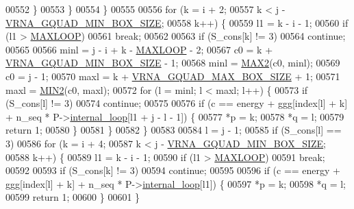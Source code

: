 \begin{DoxyCode}
00552       \}
00553     \}
00554   \}
00555 
00556   \textcolor{keywordflow}{for} (k = i + 2;
00557        k < j - \mbox{\hyperlink{group__energy__parameters_gad7bdd880afca461f97763d79ee57a347}{VRNA\_GQUAD\_MIN\_BOX\_SIZE}};
00558        k++) \{
00559     l1 = k - i - 1;
00560     \textcolor{keywordflow}{if} (l1 > \mbox{\hyperlink{energy__const_8h_ad1bd6eabac419670ddd3c9ed82145988}{MAXLOOP}})
00561       \textcolor{keywordflow}{break};
00562 
00563     \textcolor{keywordflow}{if} (S\_cons[k] != 3)
00564       \textcolor{keywordflow}{continue};
00565 
00566     minl  = j - i + k - \mbox{\hyperlink{energy__const_8h_ad1bd6eabac419670ddd3c9ed82145988}{MAXLOOP}} - 2;
00567     c0    = k + \mbox{\hyperlink{group__energy__parameters_gad7bdd880afca461f97763d79ee57a347}{VRNA\_GQUAD\_MIN\_BOX\_SIZE}} - 1;
00568     minl  = \mbox{\hyperlink{group__utils_ga33297b3679c713b0c4d897cd0fe3b122}{MAX2}}(c0, minl);
00569     c0    = j - 1;
00570     maxl  = k + \mbox{\hyperlink{group__energy__parameters_ga56cafabad2f8a7db83f2d5d3b0e8d313}{VRNA\_GQUAD\_MAX\_BOX\_SIZE}} + 1;
00571     maxl  = \mbox{\hyperlink{group__utils_gae0b9cd0ce090bd69b951aa73e8fa4f7d}{MIN2}}(c0, maxl);
00572     \textcolor{keywordflow}{for} (l = minl; l < maxl; l++) \{
00573       \textcolor{keywordflow}{if} (S\_cons[l] != 3)
00574         \textcolor{keywordflow}{continue};
00575 
00576       \textcolor{keywordflow}{if} (c == energy + ggg[index[l] + k] + n\_seq * P->\mbox{\hyperlink{group__energy__parameters_a2a4fb2c65023ec371c9b96573da6d2fc}{internal\_loop}}[l1 + j - l - 1]) \{
00577         *p  = k;
00578         *q  = l;
00579         \textcolor{keywordflow}{return} 1;
00580       \}
00581     \}
00582   \}
00583 
00584   l = j - 1;
00585   \textcolor{keywordflow}{if} (S\_cons[l] == 3)
00586     \textcolor{keywordflow}{for} (k = i + 4;
00587          k < j - \mbox{\hyperlink{group__energy__parameters_gad7bdd880afca461f97763d79ee57a347}{VRNA\_GQUAD\_MIN\_BOX\_SIZE}};
00588          k++) \{
00589       l1 = k - i - 1;
00590       \textcolor{keywordflow}{if} (l1 > \mbox{\hyperlink{energy__const_8h_ad1bd6eabac419670ddd3c9ed82145988}{MAXLOOP}})
00591         \textcolor{keywordflow}{break};
00592 
00593       \textcolor{keywordflow}{if} (S\_cons[k] != 3)
00594         \textcolor{keywordflow}{continue};
00595 
00596       \textcolor{keywordflow}{if} (c == energy + ggg[index[l] + k] + n\_seq * P->\mbox{\hyperlink{group__energy__parameters_a2a4fb2c65023ec371c9b96573da6d2fc}{internal\_loop}}[l1]) \{
00597         *p  = k;
00598         *q  = l;
00599         \textcolor{keywordflow}{return} 1;
00600       \}
00601     \}

\end{DoxyCode}
